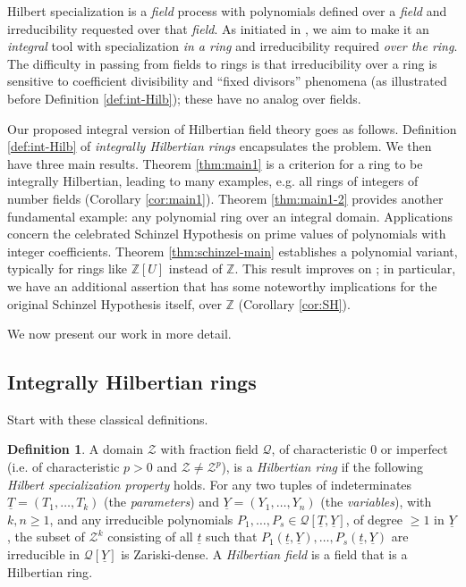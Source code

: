 \documentclass[11pt,a4paper,reqno]{amsart}
\theoremstyle{definition}
\newtheorem{defn}[thm]{Definition}
\begin{document}
Hilbert specialization is a \emph{field} process with polynomials defined over a \emph{field} and irreducibility requested over that \emph{field}. As initiated in \cite{BDKN22}, we aim to make it an \emph{integral} tool with specialization \emph{in a ring} {and} irreducibility required \emph{over the ring}. The difficulty in passing from fields to rings is that irreducibility over a ring is sensitive to coefficient divisibility and ``fixed divisors'' phenomena (as illustrated before Definition \ref{def:int-Hilb}); these have no analog over fields.
\vskip 1mm

Our proposed integral version of Hilbertian field theory goes as follows. Definition \ref{def:int-Hilb} of \emph{integrally Hilbertian rings} encapsulates the problem. We then have three main results. Theorem \ref{thm:main1} is a criterion for a ring to be integrally Hilbertian, leading to many examples, \hbox{e.g.} all rings of integers of number fields (Corollary \ref{cor:main1}). Theorem \ref{thm:main1-2} provides another fundamental example: any polynomial ring over an integral domain. Applications concern the celebrated Schinzel Hypothesis on prime values of polynomials with integer coefficients. Theorem \ref{thm:schinzel-main} establishes a polynomial variant, typically for rings like ${\mathbb Z}[U]$ instead of ${\mathbb Z}$. This result improves on \cite[Theorem 1.1]{BDN20b}; in particular, we have an additional assertion that has some noteworthy implications for the original Schinzel Hypothesis itself, over ${\mathbb Z}$ (Corollary \ref{cor:SH}).


\vskip 1mm 
We now present our work in more detail.

\subsection{Integrally Hilbertian rings} Start with these classical definitions.

\begin{defn} \label{def:Hilb-ring-field} A domain ${\mathcal Z}$ with fraction field $\mathcal{Q}$, of characteristic $0$ or imperfect  (\hbox{i.e.} of characteristic $p>0$ and ${\mathcal Z}\not={\mathcal Z}^p$), is a \emph{Hilbertian ring} if the following \emph{Hilbert specialization property} holds. For
any two tuples of indeterminates $\underline{T}=(T_1,\ldots,T_k)$ (the \emph{parameters}) and $\underline{Y}=(Y_1,\ldots,Y_n)$ (the \emph{variables}), with $k,n\geq 1$, and any irreducible polynomials $P_1,\ldots,P_s \in {\mathcal Q}[\underline{T},\underline{Y}]$, of degree $\geq 1$ in $\underline{Y}$, the subset of ${\mathcal Z}^k$ consisting of all $\underline{t}$ such that $P_1(\underline{t},\underline{Y}),\dots,P_s(\underline{t},\underline{Y})$ are irreducible in $\mathcal{Q}[\underline{Y}]$ is Zariski-dense. A \emph{Hilbertian field} is a field that is a {Hilbertian ring}. 
\end{defn}
\end{document}
